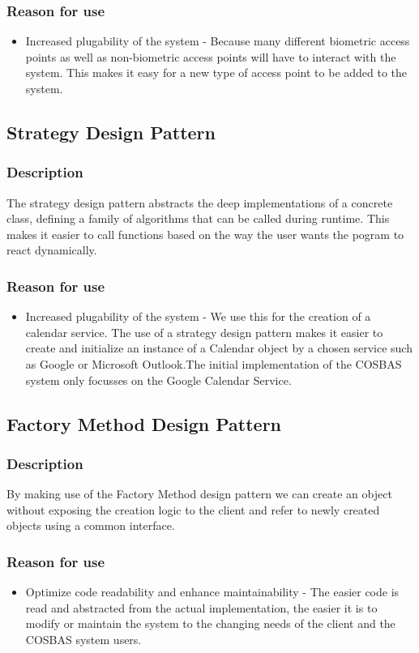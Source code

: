 	\subsubsection{Reason for use}
	\begin{itemize}
		\item{Increased plugability of the system} - Because many different biometric access points as well as non-biometric access points will have to interact with the system. This makes it easy for a new type of access point to be added to the system.
	\end{itemize}
	
\subsection{Strategy Design Pattern}
	\subsubsection{Description}
	The strategy design pattern abstracts the deep implementations of a concrete class, defining a family of algorithms that can be called during runtime. This makes it easier to call functions based on the way the user wants the pogram to react dynamically.
	
	
	\subsubsection{Reason for use}
	\begin{itemize}
		\item{Increased plugability of the system} - We use this for the creation of a calendar service. The use of a strategy design pattern makes it easier to create and initialize an instance of a Calendar object by a chosen service such as Google or Microsoft Outlook.The initial implementation of the COSBAS system only focusses on the Google Calendar Service.
	\end{itemize}
	
\subsection{Factory Method Design Pattern}
	\subsubsection{Description}
	By making use of the Factory Method design pattern we can create an object without exposing the creation logic to the client and refer to newly created objects using a common interface.
	
	\subsubsection{Reason for use}
	\begin{itemize}
		\item{Optimize code readability and enhance maintainability} - The easier code is read and abstracted from the actual implementation, the easier it is to modify or maintain the system to the changing needs of the client and the COSBAS system users. 
	\end{itemize}